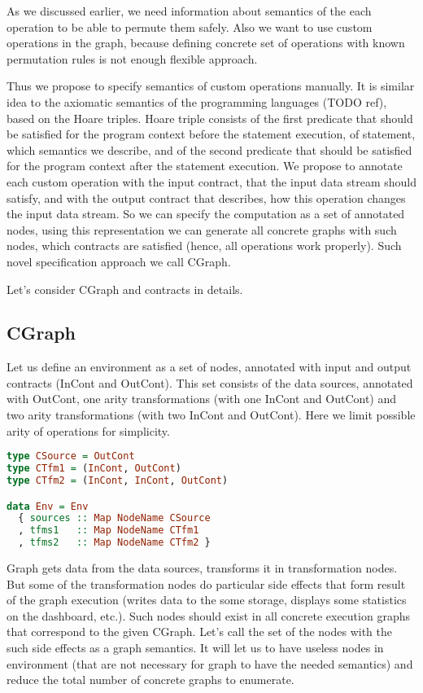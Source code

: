 As we discussed earlier, we need information about semantics of the each operation to be able to permute them safely.
Also we want to use custom operations in the graph, because defining concrete set of operations with known permutation rules is not enough flexible approach.

Thus we propose to specify semantics of custom operations manually.
It is similar idea to the axiomatic semantics of the programming languages (TODO ref), based on the Hoare triples.
Hoare triple consists of the first predicate that should be satisfied for the program context before the statement execution, of statement, which semantics we describe, and of the second predicate that should be satisfied for the program context after the statement execution.
We propose to annotate each custom operation with the input contract, that the input data stream should satisfy, and with the output contract that describes, how this operation changes the input data stream.
So we can specify the computation as a set of annotated nodes, using this representation we can generate all concrete graphs with such nodes, which contracts are satisfied (hence, all operations work properly).
Such novel specification approach we call CGraph.

Let's consider CGraph and contracts in details.

\subsection{CGraph}

Let us define an environment as a set of nodes, annotated with input and output contracts (InCont and OutCont).
This set consists of the data sources, annotated with OutCont, one arity transformations (with one InCont and OutCont) and two arity transformations (with two InCont and OutCont).
Here we limit possible arity of operations for simplicity.

\begin{lstlisting}[language=Haskell]
type CSource = OutCont
type CTfm1 = (InCont, OutCont)
type CTfm2 = (InCont, InCont, OutCont)

data Env = Env
  { sources :: Map NodeName CSource
  , tfms1   :: Map NodeName CTfm1
  , tfms2   :: Map NodeName CTfm2 }
\end{lstlisting}

Graph gets data from the data sources, transforms it in transformation nodes.
But some of the transformation nodes do particular side effects that form result of the graph execution (writes data to the some storage, displays some statistics on the dashboard, etc.).
Such nodes should exist in all concrete execution graphs that correspond to the given CGraph.
Let's call the set of the nodes with the such side effects as a graph semantics.
It will let us to have useless nodes in environment (that are not necessary for graph to have the needed semantics) and reduce the total number of concrete graphs to enumerate.

